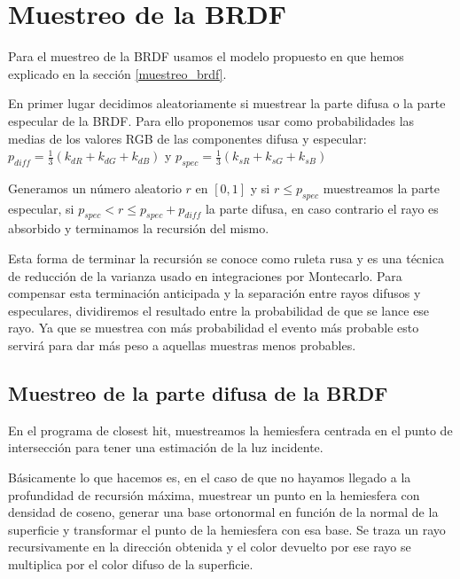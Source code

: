 \clearpage

\section{Muestreo de la BRDF}

Para el muestreo de la BRDF usamos el modelo propuesto en \cite{Lafortune1994} que hemos explicado en la sección \ref{muestreo_brdf}.
\medskip

En primer lugar decidimos aleatoriamente si muestrear la parte difusa o la parte especular de la BRDF. Para ello proponemos usar como probabilidades las medias de los valores RGB de las componentes difusa y especular: $p_{diff} =\frac{1}{3}( k_{dR} + k_{dG} + k_{dB})$ y $p_{spec} =\frac{1}{3}( k_{sR} + k_{sG} + k_{sB})$ 

\medskip

Generamos un número aleatorio $r$ en $[0,1]$ y si $r \leq p_{spec}$ muestreamos la parte especular, si $p_{spec} < r \leq p_{spec} + p_{diff}$ la parte difusa, en caso contrario el rayo es absorbido y terminamos la recursión del mismo.

\medskip

Esta forma de terminar la recursión se conoce como ruleta rusa y es una técnica de reducción de la varianza usado en integraciones por Montecarlo. Para compensar esta terminación anticipada y la separación entre rayos difusos y especulares, dividiremos el resultado entre la probabilidad de que se lance ese rayo. Ya que se muestrea con más probabilidad el evento más probable esto servirá para dar más peso a aquellas muestras menos probables.

\subsection{Muestreo de la parte difusa de la BRDF}
En el programa de closest hit, muestreamos la hemiesfera centrada en el punto de intersección para tener una estimación de la luz incidente.

\medskip

Básicamente lo que hacemos es, en el caso de que no hayamos llegado a la profundidad de recursión máxima, muestrear un punto en la hemiesfera con densidad de coseno, generar una base ortonormal en función de la normal de la superficie y transformar el punto de la hemiesfera con esa base. Se traza un rayo recursivamente en la dirección obtenida y el color devuelto por ese rayo se multiplica por el color difuso de la superficie.

